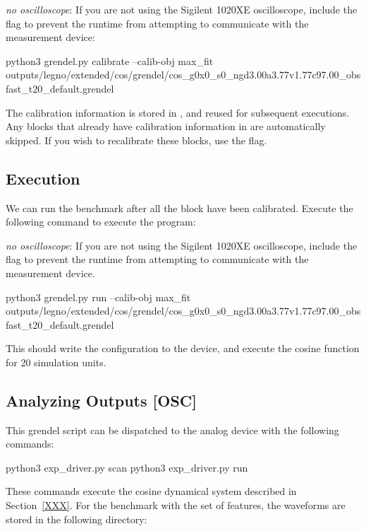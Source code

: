 \noindent\textit{no oscilloscope}: If you are not using the
Sigilent 1020XE oscilloscope, include the  flag to prevent
the runtime from attempting to communicate with the measurement device:

\begin{snippet}
python3 grendel.py calibrate --calib-obj max_fit
outputs/legno/extended/cos/grendel/cos_g0x0_s0_ngd3.00a3.77v1.77c97.00_obsfast_t20_default.grendel 
\end{snippet}
The calibration information is stored in , and reused
for subsequent executions. Any blocks that already have calibration information
in  are automatically skipped. If you wish to recalibrate these
blocks, use the  flag. 
\subsection{Execution}

We can run the benchmark after all the block have been calibrated. Execute the
following command to execute the program:

\noindent\textit{no oscilloscope}: If you are not using the
Sigilent 1020XE oscilloscope, include the  flag to prevent
the runtime from attempting to communicate with the measurement device.

\begin{snippet}
python3 grendel.py run --calib-obj max_fit outputs/legno/extended/cos/grendel/cos_g0x0_s0_ngd3.00a3.77v1.77c97.00_obsfast_t20_default.grendel
\end{snippet}

This should write the configuration to the device, and execute the cosine
function for 20 simulation units.

\subsection{Analyzing Outputs [OSC]}
This grendel script can be dispatched to the \hcdc analog device with the
following commands:

\begin{snippet}
  python3 exp_driver.py scan
  python3 exp_driver.py run
\end{snippet}

These commands execute the cosine dynamical system described in
Section~\ref{XXX}. For the  benchmark with the  set of
features, the waveforms are stored in the following directory:

